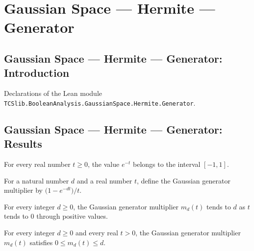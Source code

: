 \section{Gaussian Space --- Hermite --- Generator}
\subsection*{Gaussian Space --- Hermite --- Generator: Introduction}

Declarations of the Lean module \texttt{TCSlib.BooleanAnalysis.GaussianSpace.Hermite.Generator}.

\subsection*{Gaussian Space --- Hermite --- Generator: Results}

\begin{lemma}
\label{BooleanAnalysis.GaussianSpace.exp_neg_mem_correlationInterval}
\leanok
{}
For every real number $t\ge 0$, the value $e^{-t}$ belongs to the interval $[-1,1]$.
\end{lemma}

\begin{definition}
\label{BooleanAnalysis.GaussianSpace.gaussianGeneratorMultiplier}
\leanok
For a natural number $d$ and a real number $t$, define the Gaussian generator multiplier
by $\bigl(1-e^{-dt}\bigr)/t$.
\end{definition}

\begin{lemma}
\label{BooleanAnalysis.GaussianSpace.gaussianGeneratorMultiplier_tendsto}
\leanok
{}
For every integer $d\ge 0$, the Gaussian generator multiplier $m_d(t)$ tends to $d$ as
$t$ tends to $0$ through positive values.
\end{lemma}

\begin{lemma}
\label{BooleanAnalysis.GaussianSpace.gaussianGeneratorMultiplier_bounds}
\leanok
{}
For every integer $d\ge 0$ and every real $t>0$, the Gaussian generator multiplier
$m_d(t)$ satisfies $0\le m_d(t)\le d$.
\end{lemma}

